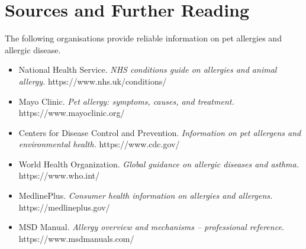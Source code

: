 \section*{Sources and Further Reading}
The following organisations provide reliable information on pet allergies and allergic disease.

\begin{itemize}
    \item National Health Service. \textit{NHS conditions guide on allergies and animal allergy.} https://www.nhs.uk/conditions/
    \item Mayo Clinic. \textit{Pet allergy: symptoms, causes, and treatment.} https://www.mayoclinic.org/
    \item Centers for Disease Control and Prevention. \textit{Information on pet allergens and environmental health.} https://www.cdc.gov/
    \item World Health Organization. \textit{Global guidance on allergic diseases and asthma.} https://www.who.int/
    \item MedlinePlus. \textit{Consumer health information on allergies and allergens.} https://medlineplus.gov/
    \item MSD Manual. \textit{Allergy overview and mechanisms -- professional reference.} https://www.msdmanuals.com/
\end{itemize}
